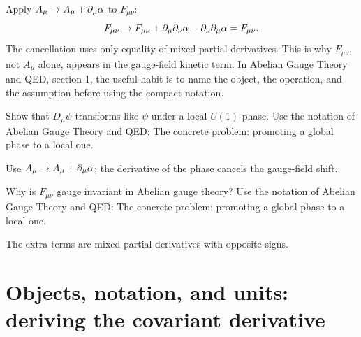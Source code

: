 \begin{example}
Apply \(A_\mu\to A_\mu+\partial_\mu\alpha\) to \(F_{\mu\nu}\):
\[
  F_{\mu\nu}\to F_{\mu\nu}+\partial_\mu\partial_\nu\alpha-\partial_\nu\partial_\mu\alpha=F_{\mu\nu}.
\]
The cancellation uses only equality of mixed partial derivatives.  This is why \(F_{\mu\nu}\), not \(A_\mu\) alone, appears in the gauge-field kinetic term.  In Abelian Gauge Theory and QED, section 1, the useful habit is to name the object, the operation, and the assumption before using the compact notation.
\end{example}



\begin{exercise}
Show that \(D_\mu\psi\) transforms like \(\psi\) under a local \(U(1)\) phase.  Use the notation of Abelian Gauge Theory and QED: The concrete problem: promoting a global phase to a local one.
\begin{answer}
Use \(A_\mu\to A_\mu+\partial_\mu\alpha\); the derivative of the phase cancels the gauge-field shift.
\end{answer}
\end{exercise}

\begin{exercise}
Why is \(F_{\mu\nu}\) gauge invariant in Abelian gauge theory?  Use the notation of Abelian Gauge Theory and QED: The concrete problem: promoting a global phase to a local one.
\begin{answer}
The extra terms are mixed partial derivatives with opposite signs.
\end{answer}
\end{exercise}



\section{Objects, notation, and units: deriving the covariant derivative}













